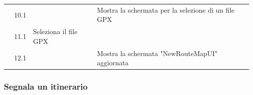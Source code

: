 \documentclass{natourDoc}
\begin{document}
\begin{tabularx}{\linewidth}{| l | p{1cm} | p{4cm} | X | X|}
	\cline{2-5}                   & 10.1                                                                                                                                   &                                                                                                                                                                      & Mostra la schermata per la selezione di un file GPX &                                                                                       \\

	\cline{2-5}                   & 11.1                                                                                                                                   & Seleziona il file GPX                                                                                                                                                &                                                     &                                                                                       \\

	\cline{2-5}                   & 12.1                                                                                                                                   &                                                                                                                                                                      & Mostra la schermata "NewRouteMapUI" aggiornata      &                                                                                       \\

	\hline
\end{tabularx}

\newpage

\subsubsection{Segnala un itinerario}
\end{document}
